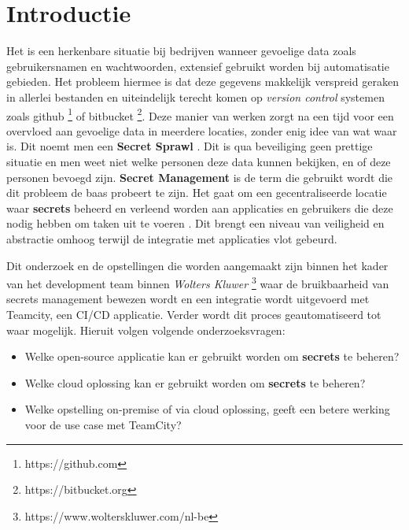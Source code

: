 
\section{Introductie} %
\label{sec:introductie}

Het is een herkenbare situatie bij bedrijven wanneer gevoelige data zoals gebruikersnamen en wachtwoorden, extensief gebruikt worden bij automatisatie gebieden. Het probleem hiermee is dat deze gegevens makkelijk verspreid geraken in allerlei bestanden en uiteindelijk terecht komen op \textit{version control} systemen zoals github \footnote{https://github.com} of bitbucket \footnote{https://bitbucket.org}. Deze manier van werken zorgt na een tijd voor een overvloed aan gevoelige data in meerdere locaties, zonder enig idee van wat waar is. Dit noemt men een \textbf{Secret Sprawl} \autocite{Tozzi2020}. Dit is qua beveiliging geen prettige situatie en men weet niet welke personen deze data kunnen bekijken, en of deze personen bevoegd zijn. \textbf{Secret Management} is de term die gebruikt wordt die dit probleem de baas probeert te zijn. Het gaat om een gecentraliseerde locatie waar \textbf{secrets} beheerd en verleend worden aan applicaties en gebruikers die deze nodig hebben om taken uit te voeren \autocite{Hoffman2021}. Dit brengt een niveau van veiligheid en abstractie omhoog terwijl de integratie met applicaties vlot gebeurd.

Dit onderzoek en de opstellingen die worden aangemaakt zijn binnen het kader van het development team binnen \textit{Wolters Kluwer} \footnote{https://www.wolterskluwer.com/nl-be} waar de bruikbaarheid van secrets management bewezen wordt en een integratie wordt uitgevoerd met Teamcity, een CI/CD applicatie. Verder wordt dit proces geautomatiseerd tot waar mogelijk. Hieruit volgen volgende onderzoeksvragen:

\begin{itemize}
    \item Welke open-source applicatie kan er gebruikt worden om \textbf{secrets} te beheren?
    \item Welke cloud oplossing kan er gebruikt worden om \textbf{secrets} te beheren?
    \item Welke opstelling on-premise of via cloud oplossing, geeft een betere werking voor de use case met TeamCity?
\end{itemize}

